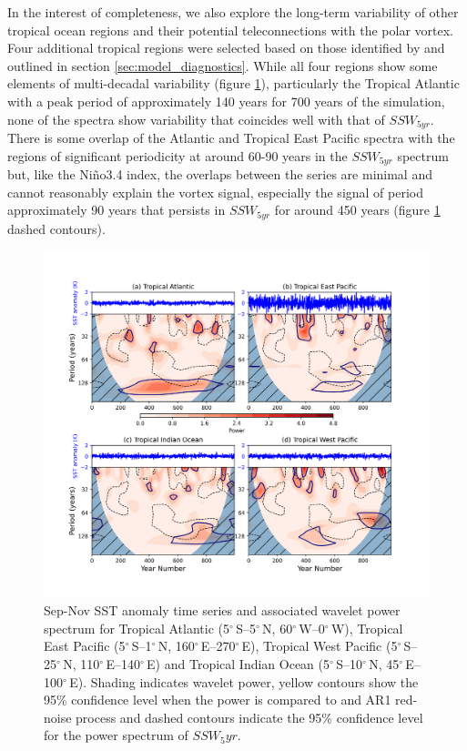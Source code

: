 In the interest of completeness, we also explore the long-term variability of other tropical ocean regions and their potential teleconnections with the polar vortex. Four additional tropical regions were selected based on those identified by \cite{scaifeTropical2017} and outlined in section \ref{sec:model_diagnostics}. While all four regions show some elements of multi-decadal variability (figure \ref{fig:tropical_SST_wavelet}), particularly the Tropical Atlantic with a peak period of approximately 140 years for 700 years of the simulation, none of the spectra show variability that coincides well with that of $SSW_{5yr}$. There is some overlap of the Atlantic and Tropical East Pacific spectra with the regions of significant periodicity at around 60-90 years in the $SSW_{5yr}$ spectrum but, like the Ni\~{n}o3.4 index, the overlaps between the series are minimal and cannot reasonably explain the vortex signal, especially the signal of period approximately 90 years that persists in $SSW_{5yr}$ for around 450 years (figure \ref{fig:tropical_SST_wavelet} dashed contours).

\begin{figure}[h!]
\begin{center}
\noindent\includegraphics[width = 0.8\linewidth]{Figures/Figures-origins/SSTs_tropical_wavelet.png}
\caption{Sep-Nov SST anomaly time series and associated wavelet power spectrum for Tropical Atlantic (5$^{\circ}$\,S–5$^{\circ}$\,N, 60$^{\circ}$\,W–0$^{\circ}$\,W), Tropical East Pacific (5$^{\circ}$\,S–1$^{\circ}$\,N, 160$^{\circ}$\,E–270$^{\circ}$\,E), Tropical West Pacific (5$^{\circ}$\,S–25$^{\circ}$\,N, 110$^{\circ}$\,E–140$^{\circ}$\,E) and Tropical Indian Ocean (5$^{\circ}$\,S–10$^{\circ}$\,N, 45$^{\circ}$\,E–100$^{\circ}$\,E). Shading indicates wavelet power, yellow contours show the 95\% confidence level when the power is compared to and AR1 red-noise process and dashed contours indicate the 95\% confidence level for the power spectrum of $SSW_5yr$.}
\label{fig:tropical_SST_wavelet}
\end{center}
\end{figure}

